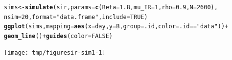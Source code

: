 \documentclass{beamer}\usepackage[]{graphicx}\usepackage[]{color}
\makeatletter
\newcommand{\hlnum}[1]{\textcolor[rgb]{0.686,0.059,0.569}{#1}}%
\newcommand{\hlstr}[1]{\textcolor[rgb]{0.192,0.494,0.8}{#1}}%
\newcommand{\hlopt}[1]{\textcolor[rgb]{0,0,0}{#1}}%
\newcommand{\hlstd}[1]{\textcolor[rgb]{0.345,0.345,0.345}{#1}}%
\newcommand{\hlkwb}[1]{\textcolor[rgb]{0.69,0.353,0.396}{#1}}%
\newcommand{\hlkwc}[1]{\textcolor[rgb]{0.333,0.667,0.333}{#1}}%
\newcommand{\hlkwd}[1]{\textcolor[rgb]{0.737,0.353,0.396}{\textbf{#1}}}%
\newenvironment{kframe}{%
 \def\at@end@of@kframe{}%
 \ifinner\ifhmode%
  \def\at@end@of@kframe{\end{minipage}}%
  \begin{minipage}{\columnwidth}%
 \fi\fi%
 \def\FrameCommand##1{\hskip\@totalleftmargin \hskip-\fboxsep
 \colorbox{shadecolor}{##1}\hskip-\fboxsep
     \hskip-\linewidth \hskip-\@totalleftmargin \hskip\columnwidth}%
 \MakeFramed {\advance\hsize-\width
   \@totalleftmargin\z@ \linewidth\hsize
   \@setminipage}}%
 {\par\unskip\endMakeFramed%
 \at@end@of@kframe}
\newenvironment{knitrout}{}{} %
\makeatother
\begin{document}
\begin{frame}[fragile]

\begin{knitrout}\small
{}\color{fgcolor}\begin{kframe}
\begin{alltt}
  \hlstd{sims} \hlkwb{<-} \hlkwd{simulate}\hlstd{(sir,}\hlkwc{params}\hlstd{=}\hlkwd{c}\hlstd{(}\hlkwc{Beta}\hlstd{=}\hlnum{1.8}\hlstd{,}\hlkwc{mu_IR}\hlstd{=}\hlnum{1}\hlstd{,}\hlkwc{rho}\hlstd{=}\hlnum{0.9}\hlstd{,}\hlkwc{N}\hlstd{=}\hlnum{2600}\hlstd{),}
    \hlkwc{nsim}\hlstd{=}\hlnum{20}\hlstd{,}\hlkwc{format}\hlstd{=}\hlstr{"data.frame"}\hlstd{,}\hlkwc{include}\hlstd{=}\hlnum{TRUE}\hlstd{)}
  \hlkwd{ggplot}\hlstd{(sims,}\hlkwc{mapping}\hlstd{=}\hlkwd{aes}\hlstd{(}\hlkwc{x}\hlstd{=day,}\hlkwc{y}\hlstd{=B,}\hlkwc{group}\hlstd{=.id,}\hlkwc{color}\hlstd{=.id}\hlopt{==}\hlstr{"data"}\hlstd{))}\hlopt{+}
    \hlkwd{geom_line}\hlstd{()}\hlopt{+}\hlkwd{guides}\hlstd{(}\hlkwc{color}\hlstd{=}\hlnum{FALSE}\hlstd{)}
\end{alltt}
\end{kframe}

{\centering \texttt{[image: tmp/figuresir-sim1-1]} 

}



\end{knitrout}

\end{frame}
\end{document}
